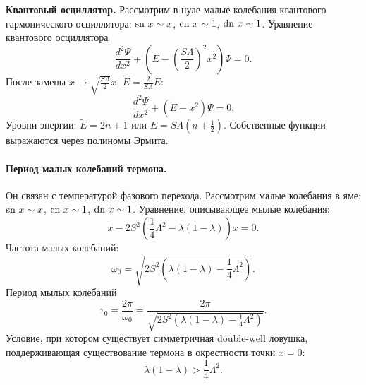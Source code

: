 \documentclass[12pt]{article}
\begin{document}
\textbf{Квантовый осциллятор.}
Рассмотрим в нуле малые колебания квантового гармонического осциллятора: $\textrm{sn}~x \sim x$, $\textrm{cn}~x \sim 1$, $\textrm{dn}~x \sim 1$.
Уравнение квантового осциллятора
%
\begin{equation}
\frac{d^2 \Psi}{dx^2} + (E - \left( \frac{S \Lambda}{2} \right)^2 x^2) \Psi = 0.
\end{equation}
%
После замены $x \to \sqrt{\frac{S \Lambda}{2}} x$, $\tilde{E} = \frac{2}{S \Lambda} E$:
%
\begin{equation}
\frac{d^2 \Psi}{dx^2} + (\tilde{E} - x^2) \Psi = 0.
\end{equation}
%
Уровни энергии: $\tilde{E} = 2n + 1$ или $E = S \Lambda (n + \frac{1}{2})$.
Собственные функции выражаются через полиномы Эрмита.

\paragraph{Период малых колебаний термона.}
Он связан с температурой фазового перехода.
Рассмотрим малые колебания в яме: $\textrm{sn}~x \sim x$, $\textrm{cn}~x \sim 1$, $\textrm{dn}~x \sim 1$.
Уравнение, описывающее мылые колебания:
%
\begin{equation}
\ddot{x} - 2S^2 (\frac{1}{4} \Lambda^2 - \lambda (1 - \lambda)) x = 0.
\end{equation}
%
Частота малых колебаний:
%
\begin{equation}
\omega_0 = \sqrt{2S^2 (\lambda (1 - \lambda) - \frac{1}{4} \Lambda^2)}.
\end{equation}
%
Период мылых колебаний
%
\begin{equation}
\tau_0 = \frac{2 \pi}{\omega_0} = \frac{2 \pi}{\sqrt{2S^2 (\lambda (1 - \lambda) - \frac{1}{4} \Lambda^2)}}.
\end{equation}
%
Условие, при котором существует симметричная double-well ловушка, поддерживающая существование термона в окрестности точки $x = 0$:
%
\begin{equation}
\lambda (1 - \lambda) > \frac{1}{4} \Lambda^2.
\end{equation}
%
\end{document}
